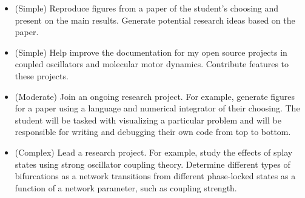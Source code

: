 \documentclass[a4paper,11pt]{article}
\begin{document}
\begin{itemize}
	\item (Simple) Reproduce figures from a paper of the student's choosing and present on the main results. Generate potential research ideas based on the paper.
	\item (Simple) Help improve the documentation for my open source projects in coupled oscillators and molecular motor dynamics. Contribute features to these projects.
	\item (Moderate) Join an ongoing research project. For example, generate figures for a paper using a language and numerical integrator of their choosing. The student will be tasked with visualizing a particular problem and will be responsible for writing and debugging their own code from top to bottom.
	\item (Complex) Lead a research project. For example, study the effects of splay states using strong oscillator coupling theory. Determine different types of bifurcations as a network transitions from different phase-locked states as a function of a network parameter, such as coupling strength.
\end{itemize}


\end{document}
